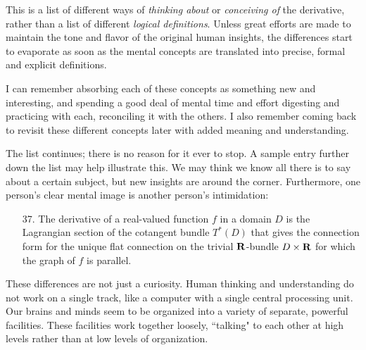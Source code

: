 \documentclass[12pt]{amsart}
\begin{document}
This is a list of different
ways of {\it thinking about} or {\it conceiving of} the 
derivative,
rather than a list of different {\it logical definitions}. 
Unless great efforts are made to maintain the tone and 
flavor of
the original human insights, the differences start to 
evaporate as
soon as the mental concepts are translated into 
precise, formal and explicit definitions.

I can remember absorbing each of these concepts as 
something new and interesting, and spending a good deal of 
mental
time and effort digesting and practicing with each,
reconciling it with the others.  I also remember coming 
back to
revisit these different concepts later with added meaning 
and understanding.

The list continues; there is no reason for it ever to stop.
A sample entry further down the list may help illustrate 
this.  We may
think we know all there is to say about a certain subject,
but new insights are around the corner. Furthermore, one 
person's clear
mental image is another person's intimidation:
\begin{enumerate}
\item[37.]
The derivative of a real-valued function $f$ in a domain $D$
is the Lagrangian section of the cotangent bundle $T^*(D)$
that gives the connection form for the unique flat 
connection on the trivial
$\bold R$-bundle $D \times \bold R$ for which the graph of 
$f$ is parallel.
\end{enumerate}

These differences are not just a curiosity.  Human 
thinking and 
understanding do not work on a single track, like a 
computer with a 
single central processing unit.  Our brains and minds seem 
to be
organized into a variety of separate, powerful facilities.
These facilities work together loosely, ``talking" to each 
other at
high levels rather than at low levels of organization.
\end{document}
